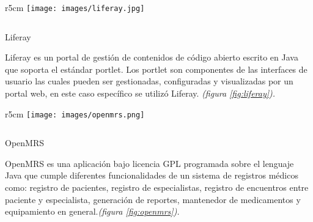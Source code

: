 
\begin{wrapfigure}{r}{5cm}
\texttt{[image: images/liferay.jpg]}
\caption{Liferay.}
\label {fig:liferay}
\vspace*{0.5cm}
\end{wrapfigure}
$ $ 
\vspace{-0.5cm}


\begin{description}
\item Liferay

Liferay es un portal de gestión de contenidos de código abierto escrito en Java que soporta el estándar portlet. Los portlet son componentes  de las interfaces de usuario las cuales pueden ser gestionadas, configuradas y visualizadas por un portal web, en este caso específico se utilizó Liferay. \emph{(figura \ref{fig:liferay}).}
\end{description}

\begin{wrapfigure}{r}{5cm}
\texttt{[image: images/openmrs.png]}
\caption{OpenMRS.}
\label {fig:openmrs}
\vspace{1cm}
\end{wrapfigure}
$ $ 
\vspace{-0.5cm}

\begin{description}
\item OpenMRS

OpenMRS es una aplicación  bajo licencia GPL programada sobre el lenguaje Java que cumple diferentes funcionalidades de un sistema de registros médicos como: registro de pacientes, registro de especialistas, registro de encuentros entre paciente y especialista, generación de reportes, mantenedor de medicamentos y equipamiento en general.\emph{(figura \ref{fig:openmrs}).}
\end{description}
\newpage 
